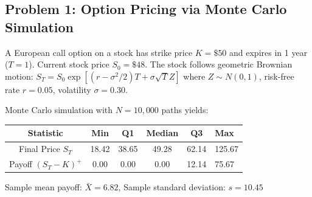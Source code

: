 \documentclass[12pt]{article}
\begin{document}
\subsection*{Problem 1: Option Pricing via Monte Carlo Simulation}

A European call option on a stock has strike price $K = \$50$ and expires in 1 year ($T = 1$). Current stock price $S_0 = \$48$. The stock follows geometric Brownian motion: $S_T = S_0 \exp[(r - \sigma^2/2)T + \sigma\sqrt{T}Z]$ where $Z \sim N(0,1)$, risk-free rate $r = 0.05$, volatility $\sigma = 0.30$.

Monte Carlo simulation with $N = 10,000$ paths yields:

\begin{center}
\begin{tabular}{ccccc}
\toprule
Statistic & Min & Q1 & Median & Q3 & Max \\
\midrule
Final Price $S_T$ & 18.42 & 38.65 & 49.28 & 62.14 & 125.67 \\
Payoff $(S_T - K)^+$ & 0.00 & 0.00 & 0.00 & 12.14 & 75.67 \\
\bottomrule
\end{tabular}
\end{center}

Sample mean payoff: $\bar{X} = 6.82$, Sample standard deviation: $s = 10.45$
\end{document}
